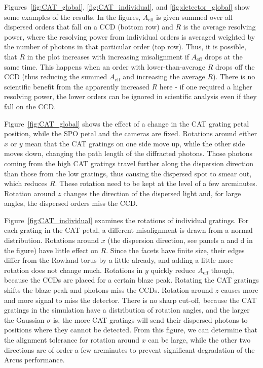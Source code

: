 \documentclass[12pt]{spieman}  %
\begin{document}
\begin{spacing}{1}
Figures~\ref{fig:CAT_global}, \ref{fig:CAT_individual}, and \ref{fig:detector_global} show some examples of the results. In the figures, $A_\mathrm{eff}$ is given summed over all dispersed orders that fall on a CCD (bottom row) and $R$ is the average resolving power, where the resolving power from individual orders is averaged weighted by the number of photons in that particular order (top row). Thus, it is possible, that $R$ in the plot increases with increasing misalignment if $A_\mathrm{eff}$ drops at the same time. This happens when an order with lower-than-average $R$ drops off the CCD (thus reducing the summed $A_\mathrm{eff}$ and increasing the average $R$). There is no scientific benefit from the apparently increased $R$ here - if one required a higher resolving power, the lower orders can be ignored in scientific analysis even if they fall on the CCD.


Figure~\ref{fig:CAT_global} shows the effect of a change in the CAT grating petal position, while the SPO petal and the cameras are fixed. Rotations around either $x$ or $y$ mean that the CAT gratings on one side move up, while the other side moves down, changing the path length of the diffracted photons. Those photons coming from the high CAT gratings travel further along the dispersion direction than those from the low gratings, thus causing the dispersed spot to smear out, which reduces $R$. These rotation need to be kept at the level of a few arcminutes. Rotation around $z$ changes the direction of the dispersed light and, for large angles, the dispersed orders miss the CCD.

Figure~\ref{fig:CAT_individual} examines the rotations of individual gratings. For each grating in the CAT petal, a different misalignment is drawn from a normal distribution. Rotations around $x$ (the dispersion direction, see panels a and d in the figure) have little effect on $R$. Since the facets have finite size, their edges differ from the Rowland torus by a little already, and adding a little more rotation does not change much. Rotations in $y$ quickly reduce $A_\mathrm{eff}$ though, because the CCDs are placed for a certain blaze peak. Rotating the CAT gratings shifts the blaze peak and photons miss the CCDs. Rotation around $z$ causes more and more signal to miss the detector. There is no sharp cut-off, because the CAT gratings in the simulation have a distribution of rotation angles, and the larger the Gaussian $\sigma$ is, the more CAT gratings will send their dispersed photons to positions where they cannot be detected. From this figure, we can determine that the alignment tolerance for rotation around $x$ can be large, while the other two directions are of order a few arcminutes to prevent significant degradation of the Arcus performance.


\end{spacing}
\end{document}
